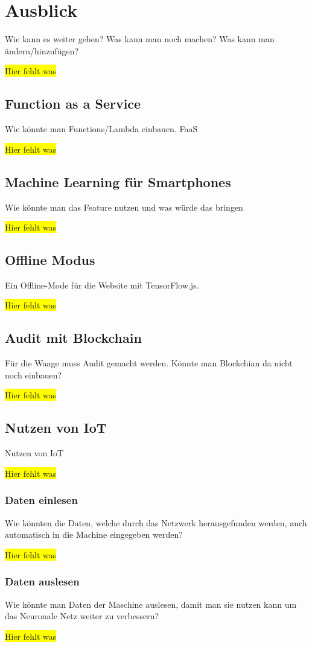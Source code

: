 \chapter{Ausblick}
\label{ch:ausblick}
Wie kann es weiter gehen? Was kann man noch machen? Was kann man ändern/hinzufügen?

\colorbox{yellow}{Hier fehlt was}

\section{Function as a Service}
Wie könnte man Functions/Lambda einbauen. FaaS

\colorbox{yellow}{Hier fehlt was}

\section{Machine Learning für Smartphones}
Wie könnte man das Feature nutzen und was würde das bringen

\colorbox{yellow}{Hier fehlt was}

\section{Offline Modus}
Ein Offline-Mode für die Website mit TensorFlow.js.

\colorbox{yellow}{Hier fehlt was}

\section{Audit mit Blockchain}
Für die Waage muss Audit gemacht werden. Könnte man Blockchian da nicht noch einbauen?

\colorbox{yellow}{Hier fehlt was}

\section{Nutzen von IoT}
Nutzen von IoT

\colorbox{yellow}{Hier fehlt was}

\subsection{Daten einlesen}
Wie könnten die Daten, welche durch das Netzwerk herausgefunden werden, auch automatisch in die Machine eingegeben werden?

\colorbox{yellow}{Hier fehlt was}

\subsection{Daten auslesen}
Wie könnte man Daten der Maschine auslesen, damit man sie nutzen kann um das Neuronale Netz weiter zu verbessern?

\colorbox{yellow}{Hier fehlt was}